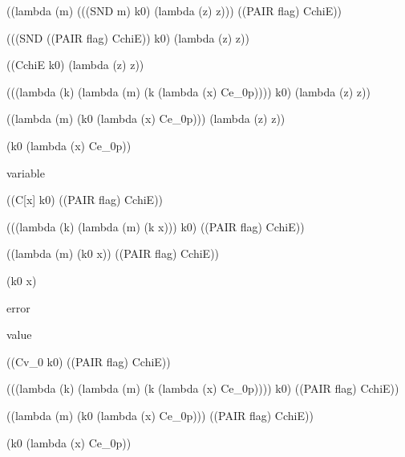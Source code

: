 \documentclass[ms,electronic,twosidetoc,letterpaper,chaptercenter,parttop]{byumsphd}
\begin{document}
\begin{singlespace}
\begin{schemedisplay}
((lambda (m) (((SND m) k0) (lambda (z) z))) ((PAIR flag) CchiE))
\end{schemedisplay}

\begin{schemedisplay}
(((SND ((PAIR flag) CchiE)) k0) (lambda (z) z))
\end{schemedisplay}

\begin{schemedisplay}
((CchiE k0) (lambda (z) z))
\end{schemedisplay}

\begin{schemedisplay}
(((lambda (k) (lambda (m) (k (lambda (x) Ce_0p)))) k0) (lambda (z) z))
\end{schemedisplay}

\begin{schemedisplay}
((lambda (m) (k0 (lambda (x) Ce_0p))) (lambda (z) z))
\end{schemedisplay}

\begin{schemedisplay}
(k0 (lambda (x) Ce_0p))
\end{schemedisplay}

variable
\begin{schemedisplay}
((C[x] k0) ((PAIR flag) CchiE))
\end{schemedisplay}

\begin{schemedisplay}
(((lambda (k) (lambda (m) (k x))) k0) ((PAIR flag) CchiE))
\end{schemedisplay}

\begin{schemedisplay}
((lambda (m) (k0 x)) ((PAIR flag) CchiE))
\end{schemedisplay}

\begin{schemedisplay}
(k0 x)
\end{schemedisplay}

\begin{schemedisplay}
error
\end{schemedisplay}

value
\begin{schemedisplay}
((Cv_0 k0) ((PAIR flag) CchiE))
\end{schemedisplay}

\begin{schemedisplay}
(((lambda (k) (lambda (m) (k (lambda (x) Ce_0p)))) k0) ((PAIR flag) CchiE))
\end{schemedisplay}

\begin{schemedisplay}
((lambda (m) (k0 (lambda (x) Ce_0p))) ((PAIR flag) CchiE))
\end{schemedisplay}

\begin{schemedisplay}
(k0 (lambda (x) Ce_0p))
\end{schemedisplay}
\end{singlespace}



\end{document}
